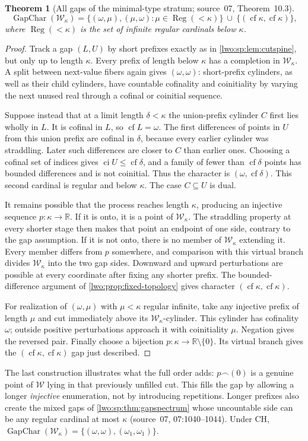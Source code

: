 \documentclass[11pt,a4paper]{article}
\newtheorem{theorem}{Theorem}[section]
\theoremstyle{definition}
\theoremstyle{remark}
\newcommand{\R}{\mathbb R}
\newcommand{\W}{\mathcal W}
\newcommand{\cat}{\mathbin{\frown}}
\newcommand{\cf}{\operatorname{cf}}
\newcommand{\ci}{\operatorname{ci}}
\newcommand{\Reg}{\operatorname{Reg}}
\newcommand{\GapChar}{\operatorname{GapChar}}
\begin{document}
\begin{theorem}[All gaps of the minimal-type stratum; source~07, Theorem~10.3]
\label{lwo:rk:thm:Pgaps}
\[
 \GapChar(\W_\kappa)=
 \{(\omega,\mu),(\mu,\omega):\mu\in\Reg(<\kappa)\}
 \ \cup\ \{(\cf\kappa,\cf\kappa)\},
\]
where $\Reg(<\kappa)$ is the set of infinite regular cardinals below $\kappa$.
\end{theorem}
\begin{proof}
Track a gap $(L,U)$ by short prefixes exactly as in \cref{lwo:sp:lem:cutspine},
but only up to length $\kappa$. Every prefix of length below $\kappa$ has a
completion in $\W_\kappa$. A split between next-value fibers again gives
$(\omega,\omega)$: short-prefix cylinders, as well as their child cylinders,
have countable cofinality and coinitiality by varying the next unused real
through a cofinal or coinitial sequence.

Suppose instead that at a limit length $\delta<\kappa$ the union-prefix
cylinder $C$ first lies wholly in $L$. It is cofinal in $L$, so
$\cf L=\omega$. The first differences of points in $U$ from this union prefix
are cofinal in $\delta$, because every earlier cylinder was straddling. Later
such differences are closer to $C$ than earlier ones. Choosing a cofinal set
of indices gives $\ci U\leq\cf\delta$, and a family of fewer than $\cf\delta$
points has bounded differences and is not coinitial. Thus the character is
$(\omega,\cf\delta)$. This second cardinal is regular and below $\kappa$. The
case $C\subseteq U$ is dual.

It remains possible that the process reaches length $\kappa$, producing an
injective sequence $p:\kappa\to\R$. If it is onto, it is a point of
$\W_\kappa$. The straddling property at every shorter stage then makes that
point an endpoint of one side, contrary to the gap assumption. If it is not
onto, there is no member of $\W_\kappa$ extending it. Every member differs
from $p$ somewhere, and comparison with this virtual branch divides
$\W_\kappa$ into the two gap sides. Downward and upward perturbations are
possible at every coordinate after fixing any shorter prefix. The
bounded-difference argument of \cref{lwo:prop:fixed-topology} gives character
$(\cf\kappa,\cf\kappa)$.

For realization of $(\omega,\mu)$ with $\mu<\kappa$ regular infinite, take any
injective prefix of length $\mu$ and cut immediately above its
$\W_\kappa$-cylinder. This cylinder has cofinality $\omega$; outside positive
perturbations approach it with coinitiality $\mu$. Negation gives the reversed
pair. Finally choose a bijection $p:\kappa\to\R\setminus\{0\}$. Its virtual
branch gives the $(\cf\kappa,\cf\kappa)$ gap just described.
\end{proof}
The last construction illustrates what the full order adds: $p\cat(0)$ is a
genuine point of $\W$ lying in that previously unfilled cut. This fills the gap
by allowing a longer \emph{injective} enumeration, not by introducing
repetitions. Longer prefixes also create the mixed gaps of
\cref{lwo:sp:thm:gapspectrum} whose uncountable side can be any regular
cardinal at most $\kappa$ (source~07, 07:1040--1044). Under CH,
$\GapChar(\W_\kappa)=\{(\omega,\omega),(\omega_1,\omega_1)\}$.
\end{document}
